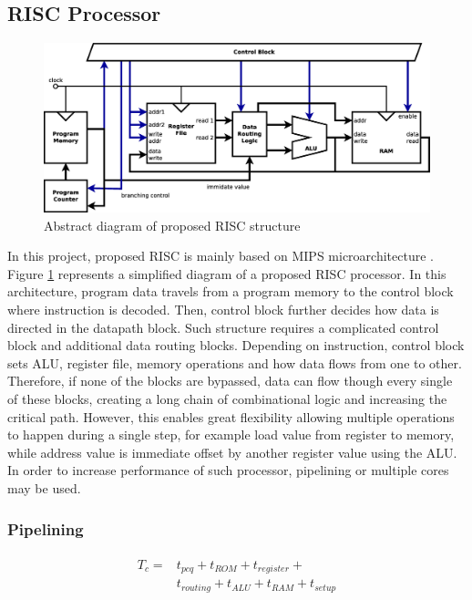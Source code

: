 \subsection{RISC Processor}

\begin{figure}[t!]
	\centering
	\includegraphics[width=\linewidth]{../resources/risc.eps}
	\caption{Abstract diagram of proposed RISC structure}
	\label{fig:risc_simple}
\end{figure}

In this project, proposed RISC is mainly based on MIPS microarchitecture \autocite{harris_harris_2013}. Figure \ref{fig:risc_simple} represents a simplified diagram of a proposed RISC processor. In this architecture, program data travels from a program memory to the control block where instruction is decoded. Then, control block further decides how data is directed in the datapath block. Such structure requires a complicated control block and additional data routing blocks. Depending on instruction, control block sets ALU, register file, memory operations and how data flows from one to other. Therefore, if none of the blocks are bypassed, data can flow though every single of these blocks, creating a long chain of combinational logic and increasing the critical path. However, this enables great flexibility allowing multiple operations to happen during a single step, for example load value from register to memory, while address value is immediate offset by another register value using the ALU. In order to increase performance of such processor, pipelining or multiple cores may be used.

\subsubsection{Pipelining}
\begin{multline}\label{eq:tc}
	\begin{split}
	T_c =& t_{pcq} + t_{ROM} + t_{register} + \\
	 	 & t_{routing} + t_{ALU} + t_{RAM} + t_{setup}
	\end{split}
\end{multline}

